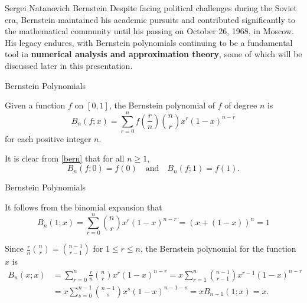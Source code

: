 \documentclass{beamer}
\begin{document}
\begin{frame}{Sergei Natanovich Bernstein}
    Despite facing political challenges during the Soviet era, Bernstein maintained his academic pursuits and contributed significantly to the mathematical community until his passing on October 26, 1968, in Moscow. His legacy endures, with Bernstein polynomials continuing to be a fundamental tool in \textbf{numerical analysis and approximation theory}, some of which will be discussed later in this presentation.
\end{frame}
\begin{frame}{Bernstein Polynomials}
\begin{definition}
  Given a function $f$ on $[0, 1]$, the Bernstein polynomial of $f$ of degree $n$ is
\begin{equation}
B_n(f; x) = \sum_{r=0}^n  f\left(\frac{r}{n}\right) \binom{n}{r} x^r (1-x)^{n-r}
\label{bern}
\end{equation}
for each positive integer $n$. 
\end{definition}
    

It is clear from \eqref{bern} that for all $n \geq 1$,
\begin{equation}
    B_n(f;0)=f(0) \quad \text{and} \quad B_n(f;1)=f(1).
\end{equation}
\end{frame}
\begin{frame}{Bernstein Polynomials}
 \begin{block}{}
    It follows from the binomial expansion that
\begin{equation}
B_n(1; x) = \sum_{r=0}^n \binom{n}{r} x^r (1-x)^{n-r}=(x+(1-x))^n=1
\label{bern_1}
\end{equation}
\end{block}
\pause
 \begin{block}{}
Since $\frac{r}{n} \binom{n}{r} = \binom{n-1}{r-1}
$
for $1 \leq r \leq n$, the Bernstein polynomial for the function $x$ is 
\begin{align}
B_n(x; x) &= \sum_{r=0}^n \frac{r}{n} \binom{n}{r} x^r (1-x)^{n-r} = x \sum_{r=1}^n \binom{n-1}{r-1} x^{r-1}(1-x)^{n-r} \nonumber\\
 &= x \sum_{s=0}^{n-1} \binom{n-1}{s} x^s (1-x)^{n-1-s} = xB_{n-1}(1; x) = x.\label{bern_x}
\end{align}
\end{block}
\end{frame}
\end{document}
